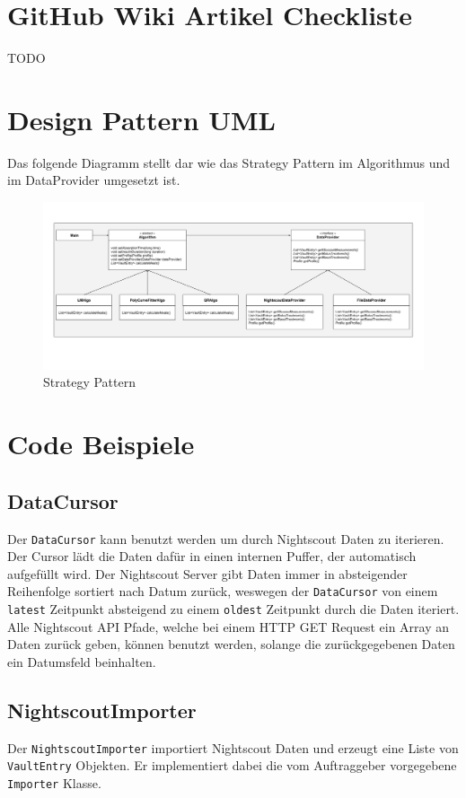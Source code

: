 \documentclass[accentcolor=tud0b,12pt,paper=a4]{tudreport}
\begin{document}
\section{GitHub Wiki Artikel Checkliste}
	TODO

\section{Design Pattern UML}
Das folgende Diagramm stellt dar wie das Strategy Pattern im Algorithmus und im DataProvider umgesetzt ist.
\begin{figure}[h]
\centering
\caption{Strategy Pattern}
\includegraphics[width=1.0\textwidth,keepaspectratio]{UML_Algorithmen}
\end{figure}

\section{Code Beispiele}
\subsection{DataCursor}
Der \texttt{DataCursor} kann benutzt werden um durch Nightscout Daten zu iterieren. Der Cursor lädt die Daten dafür in einen internen Puffer, der automatisch aufgefüllt wird. Der Nightscout Server gibt Daten immer in absteigender Reihenfolge sortiert nach Datum zurück, weswegen der \texttt{DataCursor} von einem \texttt{latest} Zeitpunkt absteigend zu einem \texttt{oldest} Zeitpunkt durch die Daten iteriert. Alle Nightscout API Pfade, welche bei einem HTTP GET Request ein Array an Daten zurück geben, können benutzt werden, solange die zurückgegebenen Daten ein Datumsfeld beinhalten.


\subsection{NightscoutImporter}
Der \texttt{NightscoutImporter} importiert Nightscout Daten und erzeugt eine Liste von \texttt{VaultEntry} Objekten. Er implementiert dabei die vom Auftraggeber vorgegebene \texttt{Importer} Klasse.

\end{document}
